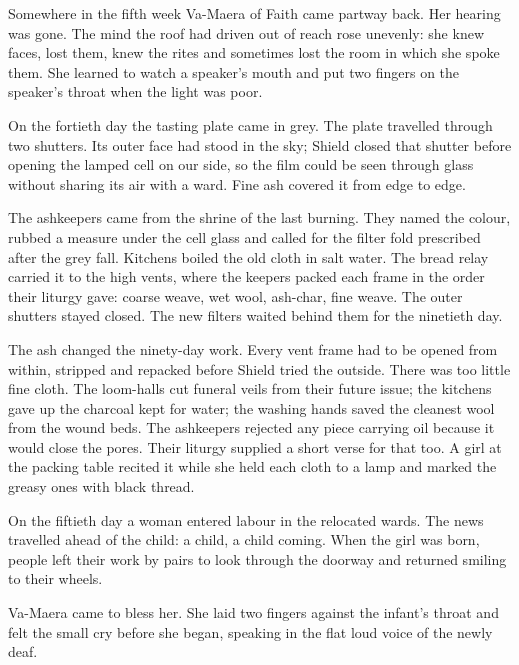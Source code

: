 Somewhere in the fifth week Va-Maera of Faith came partway back. Her hearing was gone. The mind the roof had driven out of reach rose unevenly: she knew faces, lost them, knew the rites and sometimes lost the room in which she spoke them. She learned to watch a speaker's mouth and put two fingers on the speaker's throat when the light was poor.\par

On the fortieth day the tasting plate came in grey. The plate travelled through two shutters. Its outer face had stood in the sky; Shield closed that shutter before opening the lamped cell on our side, so the film could be seen through glass without sharing its air with a ward. Fine ash covered it from edge to edge.\par

The ashkeepers came from the shrine of the last burning. They named the colour, rubbed a measure under the cell glass and called for the filter fold prescribed after the grey fall. Kitchens boiled the old cloth in salt water. The bread relay carried it to the high vents, where the keepers packed each frame in the order their liturgy gave: coarse weave, wet wool, ash-char, fine weave. The outer shutters stayed closed. The new filters waited behind them for the ninetieth day.\par

The ash changed the ninety-day work. Every vent frame had to be opened from within, stripped and repacked before Shield tried the outside. There was too little fine cloth. The loom-halls cut funeral veils from their future issue; the kitchens gave up the charcoal kept for water; the washing hands saved the cleanest wool from the wound beds. The ashkeepers rejected any piece carrying oil because it would close the pores. Their liturgy supplied a short verse for that too. A girl at the packing table recited it while she held each cloth to a lamp and marked the greasy ones with black thread.\par

On the fiftieth day a woman entered labour in the relocated wards. The news travelled ahead of the child: a child, a child coming. When the girl was born, people left their work by pairs to look through the doorway and returned smiling to their wheels.\par

Va-Maera came to bless her. She laid two fingers against the infant's throat and felt the small cry before she began, speaking in the flat loud voice of the newly deaf.\par

